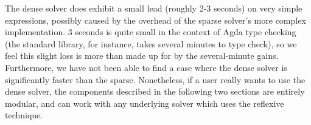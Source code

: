 \documentclass[draft, twocolumn]{article}
\theoremstyle{definition}
\theoremstyle{definition}
\begin{document}
The dense solver does exhibit a small lead (roughly 2-3 seconds) on very simple
expressions, possibly caused by the overhead of the sparse solver's more complex
implementation. 3 seconds is quite small in the context of Agda type checking
(the standard library, for instance, takes several minutes to type check), so we
feel this slight loss is more than made up for by the several-minute gains.
Furthermore, we have not been able to find a case where the dense solver is
significantly faster than the sparse. Nonetheless, if a user really wants to use
the dense solver, the components described in the following two sections are
entirely modular, and can work with any underlying solver which uses the
reflexive technique.
\end{document}
